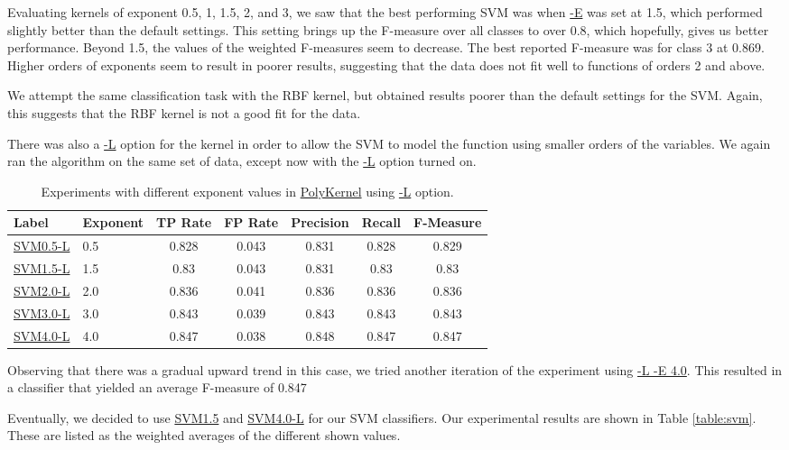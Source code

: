 \documentclass[12pt]{article}
\begin{document}
Evaluating kernels of exponent 0.5, 1, 1.5, 2, and 3, we saw that the best performing SVM was when \url{-E} was set at 1.5, which performed slightly better than the default settings. This setting brings up the F-measure over all classes to over 0.8, which hopefully, gives us better performance. Beyond 1.5, the values of the weighted F-measures seem to decrease. The best reported F-measure was for class 3 at 0.869. Higher orders of exponents seem to result in poorer results, suggesting that the data does not fit well to functions of orders 2 and above. %

We attempt the same classification task with the RBF kernel, but obtained results poorer than the default settings for the SVM. Again, this suggests that the RBF kernel is not a good fit for the data.

There was also a \url{-L} option for the kernel in order to allow the SVM to model the function using smaller orders of the variables. We again ran the algorithm on the same set of data, except now with the \url{-L} option turned on.
\begin{table}[h]
\linespread{1}
\centering
\begin{tabular}{|l |l|c c c c c|}
\hline
Label & Exponent	&	TP Rate & FP Rate & Precision & Recall  & F-Measure	 \\
\hline
\url{SVM0.5-L} & 0.5 	& 0.828  &    0.043   &    0.831  &    0.828  &    0.829  \\ 
\url{SVM1.5-L} & 1.5	& 0.83   &    0.043   &    0.831  &    0.83   &    0.83   \\
\url{SVM2.0-L} & 2.0	& 0.836  &    0.041   &    0.836  &    0.836  &    0.836  \\
\url{SVM3.0-L} & 3.0	& 0.843  &    0.039   &    0.843  &    0.843  &    0.843  \\
\url{SVM4.0-L} & 4.0	& 0.847  &    0.038   &    0.848  &    0.847  &    0.847  \\
\hline
\end{tabular}
\caption{Experiments with different exponent values in \url{PolyKernel} using \url{-L} option.}
\label{table:svm-l}
\end{table}

Observing that there was a gradual upward trend in this case, we tried another iteration of the experiment using \url{-L -E 4.0}. This resulted in a classifier that yielded an average F-measure of 0.847

Eventually, we decided to use \url{SVM1.5} and \url{SVM4.0-L} for our SVM classifiers. Our experimental results are shown in Table \ref{table:svm}. These are listed as the weighted averages of the different shown values.
\end{document}
